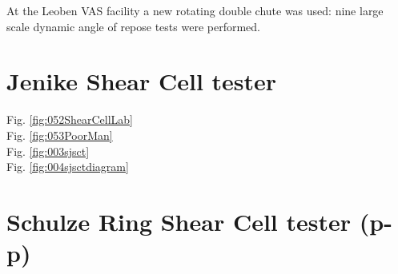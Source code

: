 At the Leoben VAS facility a new rotating double chute was used: 
nine large scale dynamic angle of repose tests were performed. 

\section{Jenike Shear Cell tester}
\label{sec:jsct}

Fig. \ref{fig:052ShearCellLab} \\
Fig. \ref{fig:053PoorMan} \\
Fig. \ref{fig:003sjsct} \\

Fig. \ref{fig:004sjsctdiagram} \\


\section{Schulze Ring Shear Cell tester (p-p)}
\label{sec:SRSCT}



